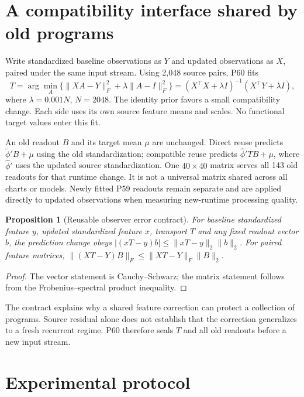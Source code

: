 \documentclass[11pt]{article}
\newtheorem{proposition}{Proposition}
\begin{document}
\section{A compatibility interface shared by old programs}
Write standardized baseline observations as $Y$ and updated observations as $X$, paired under the same input stream. Using 2,048 source pairs, P60 fits
\begin{equation}
 T=\arg\min_A\{\|XA-Y\|_F^2+\lambda\|A-I\|_F^2\}
 =(X^\top X+\lambda I)^{-1}(X^\top Y+\lambda I),
\end{equation}
where $\lambda=0.001N$, $N=2048$. The identity prior favors a small compatibility change. Each side uses its own source feature means and scales. No functional target values enter this fit.

An old readout $B$ and its target mean $\mu$ are unchanged. Direct reuse predicts $\widetilde\phi' B+\mu$ using the old standardization; compatible reuse predicts $\widehat\phi' T B+\mu$, where $\widehat\phi'$ uses the updated source standardization. One $40\times40$ matrix serves all 143 old readouts for that runtime change. It is not a universal matrix shared across all charts or models. Newly fitted P59 readouts remain separate and are applied directly to updated observations when measuring new-runtime processing quality.

\begin{samepage}
\begin{proposition}[Reusable observer error contract]
For baseline standardized feature $y$, updated standardized feature $x$, transport $T$ and any fixed readout vector $b$, the prediction change obeys
$|(xT-y)b|\leq\|xT-y\|_2\|b\|_2$.
For paired feature matrices, $\|(XT-Y)B\|_F\leq\|XT-Y\|_F\|B\|_2$.
\end{proposition}
\begin{proof}
The vector statement is Cauchy--Schwarz; the matrix statement follows from the Frobenius--spectral product inequality.
\end{proof}
\end{samepage}
The contract explains why a shared feature correction can protect a collection of programs. Source residual alone does not establish that the correction generalizes to a fresh recurrent regime. P60 therefore seals $T$ and all old readouts before a new input stream.

\section{Experimental protocol}
\end{document}
